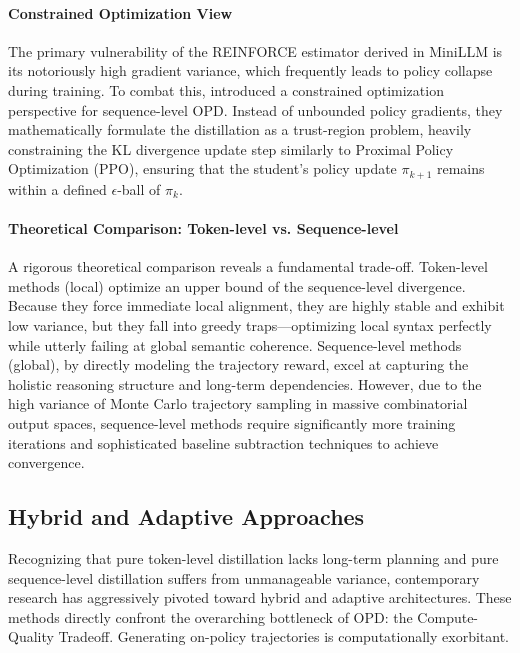 \paragraph{Constrained Optimization View}
The primary vulnerability of the REINFORCE estimator derived in MiniLLM is its notoriously high gradient variance, which frequently leads to policy collapse during training. To combat this, \citet{2509.22921} introduced a constrained optimization perspective for sequence-level OPD. Instead of unbounded policy gradients, they mathematically formulate the distillation as a trust-region problem, heavily constraining the KL divergence update step similarly to Proximal Policy Optimization (PPO), ensuring that the student's policy update $\pi_{k+1}$ remains within a defined $\epsilon$-ball of $\pi_k$.

\paragraph{Theoretical Comparison: Token-level vs. Sequence-level}
A rigorous theoretical comparison reveals a fundamental trade-off. Token-level methods (local) optimize an upper bound of the sequence-level divergence. Because they force immediate local alignment, they are highly stable and exhibit low variance, but they fall into greedy traps—optimizing local syntax perfectly while utterly failing at global semantic coherence. Sequence-level methods (global), by directly modeling the trajectory reward, excel at capturing the holistic reasoning structure and long-term dependencies. However, due to the high variance of Monte Carlo trajectory sampling in massive combinatorial output spaces, sequence-level methods require significantly more training iterations and sophisticated baseline subtraction techniques to achieve convergence.

\subsection{Hybrid and Adaptive Approaches}
\label{subsec:hybrid}

Recognizing that pure token-level distillation lacks long-term planning and pure sequence-level distillation suffers from unmanageable variance, contemporary research has aggressively pivoted toward hybrid and adaptive architectures. These methods directly confront the overarching bottleneck of OPD: the Compute-Quality Tradeoff. Generating on-policy trajectories is computationally exorbitant.

